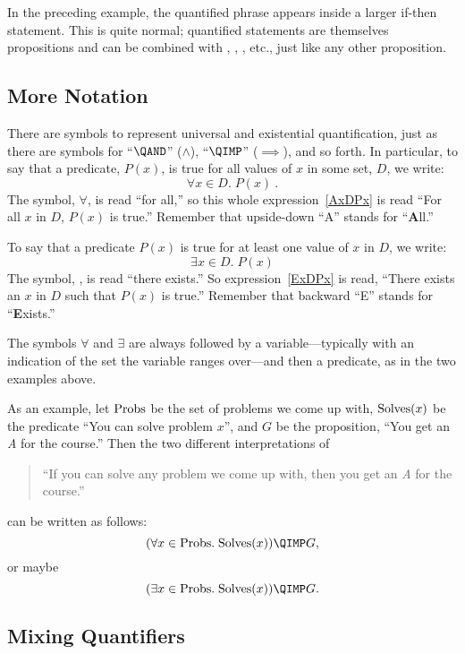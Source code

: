 \begin{editingnoes}
In the preceding example, the quantified phrase appears inside a
larger if-then statement.  This is quite normal; quantified statements
are themselves propositions and can be combined with \QAND, \QOR,
\QIMPLIES, etc., just like any other proposition.

\subsection{More Notation}

There are symbols to represent universal and existential
quantification, just as there are symbols for ``$\QAND$'' ($\wedge$),
``$\QIMP$'' ($\implies$), and so forth.  In particular, to say
that a predicate, $P(x)$, is true for all values of $x$ in some set,
$D$, we write:
\begin{equation}\label{AxDPx}
\forall x \in D.\; P(x)\ .
\end{equation}
The  symbol, $\forall$, is read ``for all,''
so this whole expression~\eqref{AxDPx} is read ``For all $x$ in $D$,
$P(x)$ is true.''  Remember that upside-down ``A'' stands for
``\textbf{A}ll.''

To say that a predicate $P(x)$ is true for at least one value of $x$
in $D$, we write:
\begin{equation}\label{ExDPx}
\exists x \in D.\; P(x)
\end{equation}
The  symbol, \term{$\exists$}, is read
``there exists.''  So expression~\eqref{ExDPx} is read, ``There exists
an $x$ in $D$ such that $P(x)$ is true.''  Remember that backward
``E'' stands for ``\textbf{E}xists.''

The symbols $\forall$ and $\exists$ are always followed by a
variable---typically with an indication of the set the variable ranges
over---and then a predicate, as in the two examples above.

As an example, let $\text{Probs}$ be the set of problems we come up with,
$\text{Solves}(x)$ be the predicate ``You can solve problem $x$'', and $G$ be
the proposition, ``You get an \emph{A} for the course.''  Then the two
different interpretations of
%
\begin{quote}
  ``If you can solve any problem we come up with, then you get an \emph{A}
  for the course.''
\end{quote}
can be written as follows:
\[
(\forall x \in \probs.\; \solves(x)) \QIMP G,
\]
or maybe
\[
(\exists x \in \probs.\; \solves(x)) \QIMP G.
\]

\subsection{Mixing Quantifiers}


\end{editingnoes}
